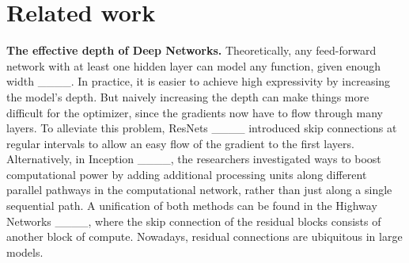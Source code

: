 \section{Related work}
\textbf{The effective depth of Deep Networks.} Theoretically, any feed-forward network with at least one hidden layer can model any function, given enough width ____. In practice, it is easier to achieve high expressivity by increasing the model's depth. But naively increasing the depth can make things more difficult for the optimizer, since the gradients now have to flow through many layers. To alleviate this problem, ResNets ____ introduced skip connections at regular intervals to allow an easy flow of the gradient to the first layers. Alternatively, in Inception ____, the researchers investigated ways to boost computational power by adding additional processing units along different parallel pathways in the computational network, rather than just along a single sequential path. A unification of both methods can be found in the Highway Networks ____, where the skip connection of the residual blocks consists of another block of compute. Nowadays, residual connections are ubiquitous in large models.


